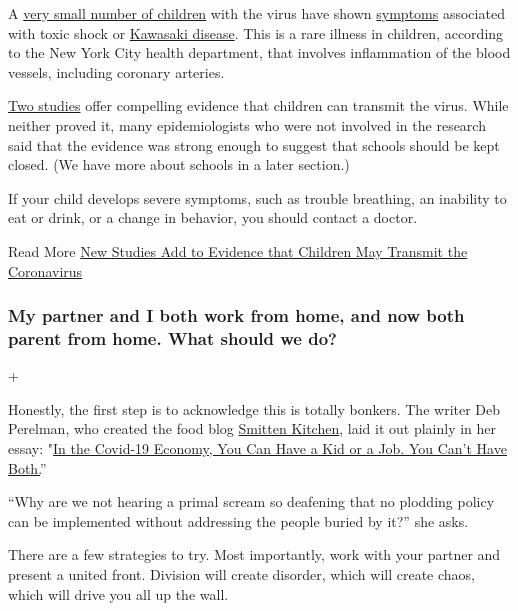 A
\href{https://www.nytimes.com/2020/05/19/parenting/pmis-coronavirus-children.html}{very
small number of children} with the virus have shown
\href{https://www.nytimes.com/article/coronavirus-symptoms.html}{symptoms}
associated with toxic shock or
\href{https://www.nytimes.com/article/kawasaki-disease-coronavirus-children.html}{Kawasaki
disease}. This is a rare illness in children, according to the New York
City health department, that involves inflammation of the blood vessels,
including coronary arteries.

\href{https://www.nytimes.com/2020/05/05/health/coronavirus-children-transmission-school.html}{Two
studies} offer compelling evidence that children can transmit the virus.
While neither proved it, many epidemiologists who were not involved in
the research said that the evidence was strong enough to suggest that
schools should be kept closed. (We have more about schools in a later
section.)

If your child develops severe symptoms, such as trouble breathing, an
inability to eat or drink, or a change in behavior, you should contact a
doctor.

 Read More
\href{https://www.nytimes.com/2020/05/05/health/coronavirus-children-transmission-school.html}{New
Studies Add to Evidence that Children May Transmit the Coronavirus}

\hypertarget{my-partner-and-i-both-work-from-home-and-now-both-parent-from-home-what-should-we-do}{%
\subsubsection{My partner and I both work from home, and now both parent
from home. What should we
do?}\label{my-partner-and-i-both-work-from-home-and-now-both-parent-from-home-what-should-we-do}}

+

Honestly, the first step is to acknowledge this is totally bonkers. The
writer Deb Perelman, who created the food blog
\href{https://smittenkitchen.com/}{Smitten Kitchen}, laid it out plainly
in her essay:
"\href{https://www.nytimes.com/2020/07/02/business/covid-economy-parents-kids-career-homeschooling.html}{In
the Covid-19 Economy, You Can Have a Kid or a Job. You Can't Have
Both.}''

``Why are we not hearing a primal scream so deafening that no plodding
policy can be implemented without addressing the people buried by it?''
she asks.

There are a few strategies to try. Most importantly, work with your
partner and present a united front. Division will create disorder, which
will create chaos, which will drive you all up the wall.

